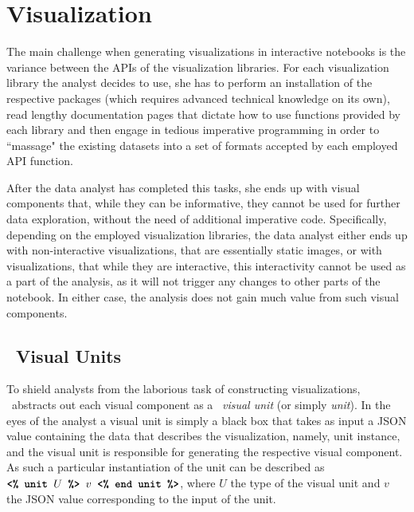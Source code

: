 \section{Visualization}
\label{section:visualization}











The main challenge when generating visualizations in interactive notebooks is the variance between the APIs of the visualization libraries. For each visualization library the analyst decides to use, she has to perform an installation of the respective packages (which requires advanced technical knowledge on its own), read lengthy documentation pages that dictate how to use functions provided by each library and then engage in tedious imperative programming in order to ``massage" the existing datasets into a set of formats accepted by each employed API function.

After the data analyst has completed this tasks, she ends up with visual components that, while they can be informative, they cannot be used for further data exploration, without the need of additional imperative code. Specifically, depending on the employed visualization libraries, the data analyst either ends up with non-interactive visualizations, that are essentially static images, or with visualizations, that while they are interactive, this interactivity cannot be used as a part of the analysis, as it will not trigger any changes to other parts of the notebook. In either case, the analysis does not gain much value from such visual components.


\subsection{\projname\ Visual Units}
\label{section:visual Units}

\noindent To shield analysts from the laborious task of constructing visualizations, \projname\ abstracts out each visual component as a \projname\ \emph{visual unit} (or simply \emph{unit}). In the eyes of the analyst a visual unit is simply a black box that takes as input a JSON value containing the data that describes the visualization, namely, unit instance, and the visual unit is responsible for generating the respective visual component. As such a particular instantiation of the unit  can be described as $\texttt{\textbf{<\% unit }} U \texttt{\textbf{ \%> }} v \texttt{\textbf{ <\% end unit \%>}}$, where $U$ the type of the visual unit and $v$ the JSON value corresponding to the input of the unit. 


